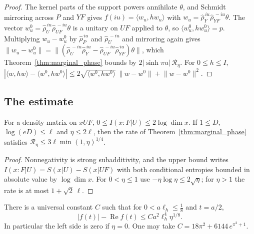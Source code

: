 \begin{proof}\leanok
    The kernel parts of the support powers annihilate $\theta$, and Schmidt
    mirroring across $P$ and $YF$ gives $f(iu)=\langle w_u,hw_u\rangle$ with
    $w_u=\widehat\rho_Y^{\,iu}\widehat\rho_{YF}^{\,-iu}\theta$. The vector
    $w_u^0=\widehat\rho_U^{\,iu}\widehat\rho_{UF}^{\,-iu}\theta$ is a unitary
    on $UF$ applied to $\theta$, so $\langle w_u^0,hw_u^0\rangle=p$.
    Multiplying $w_u-w_u^0$ by $\widehat\rho_P^{\,iu}$ and
    $\widehat\rho_U^{\,-iu}$ and mirroring again gives
    $\lVert w_u-w_u^0\rVert=\lVert(\widehat\rho_U^{\,-iu}\widehat\rho_Y^{\,iu}
    -\widehat\rho_{UF}^{\,-iu}\widehat\rho_{YF}^{\,iu})\theta\rVert$, which
    Theorem~\ref{thm:marginal_phase} bounds by
    $2|\sinh\pi u|\,\mathcal R_\eta$. For $0\le h\le I$,
    $|\langle w,hw\rangle-\langle w^0,hw^0\rangle|\le
    2\sqrt{\langle w^0,hw^0\rangle}\,\lVert w-w^0\rVert+\lVert w-w^0\rVert^2$.
\end{proof}

\subsection{The estimate}

\begin{lemma}
    \label{lem:skew_rate}
    \leanok
    For a density matrix on $xUF$, $0\le I(x:F|U)\le2\log\dim x$. If
    $1\le D$, $\log(eD)\le\ell$ and $\eta\le2\ell$, then the rate of
    Theorem~\ref{thm:marginal_phase} satisfies
    $\mathcal R_\eta\le3\ell\min(1,\eta)^{1/4}$.
\end{lemma}

\begin{proof}\leanok
    Nonnegativity is strong subadditivity, and the upper bound writes
    $I(x:F|U)=S(x|U)-S(x|UF)$ with both conditional entropies bounded in
    absolute value by $\log\dim x$. For $0<\eta\le1$ use
    $-\eta\log\eta\le2\sqrt\eta$; for $\eta>1$ the rate is at most
    $1+\sqrt{2}\,\ell$.
\end{proof}

\begin{theorem}
    \label{thm:conditional_skew}
    \leanok
    There is a universal constant $C$ such that for $0<a\ell_h\le\frac18$ and
    $t=a/2$,
    \[
      |f(t)|-\operatorname{Re}f(t)\le Ca^2\ell_h^4\eta^{1/8}.
    \]
    In particular the left side is zero if $\eta=0$. One may take
    $C=18\pi^2+6144\,e^{\pi^2+1}$.
\end{theorem}

